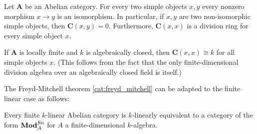 
    \begin{theorem}
        Let $\mathbf{A}$ be an Abelian category. For every two simple objects $x,y$ every nonzero morphism $x\rightarrow y$ is an isomorphism. In particular, if $x,y$ are two non-isomorphic simple objects, then $\mathbf{C}(x, y)=0$. Furthermore, $\mathbf{C}(x, x)$ is a division ring for every simple object $x$.
    \end{theorem}
    \begin{result}
        If $\mathbf{A}$ is locally finite and $k$ is algebraically closed, then $\mathbf{C}(x, x)\cong k$ for all simple objects $x$. (This follows from the fact that the only finite-dimensional division algebra over an algebraically closed field is itself.)
    \end{result}

    The Freyd-Mitchell theorem \ref{cat:freyd_mitchell} can be adapted to the finite linear case as follows:
    \begin{theorem}[Deligne]
        Every finite $k$-linear Abelian category is $k$-linearly equivalent to a category of the form $\mathbf{Mod}_A^{\text{\emph{fin}}}$ for $A$ a finite-dimensional $k$-algebra.
    \end{theorem}


